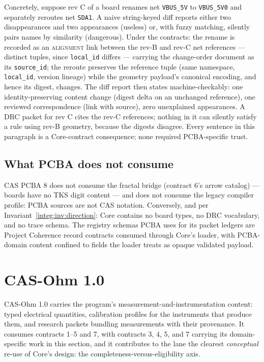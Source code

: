 \begin{example}\label{integ:ex:pcba}
Concretely, suppose rev C of a board renames net \texttt{VBUS\_5V} to \texttt{VBUS\_5V0} and separately reroutes net \texttt{SDA1}. A naive string-keyed diff reports either two disappearances and two appearances (useless) or, with fuzzy matching, silently pairs names by similarity (dangerous). Under the contracts: the rename is recorded as an \textsc{alignment} link between the rev-B and rev-C net references --- distinct tuples, since \texttt{local\_id} differs --- carrying the change-order document as its \texttt{source\_id}; the reroute preserves the reference tuple (same namespace, \texttt{local\_id}, version lineage) while the geometry payload's canonical encoding, and hence its digest, changes. The diff report then states machine-checkably: one identity-preserving content change (digest delta on an unchanged reference), one reviewed correspondence (link with source), zero unexplained appearances. A DRC packet for rev C cites the rev-C references; nothing in it can silently satisfy a rule using rev-B geometry, because the digests disagree. Every sentence in this paragraph is a Core-contract consequence; none required PCBA-specific trust.
\end{example}

\subsection{What PCBA does not consume}\label{integ:pcba:not}

CAS PCBA 8 does not consume the fractal bridge (contract 6's arrow catalog) --- boards have no TKS digit content --- and does not consume the legacy compiler profile: PCBA sources are not CAS notation. Conversely, and per Invariant~\ref{integ:inv:direction}: Core contains no board types, no DRC vocabulary, and no trace schema. The registry schemas PCBA uses for its packet ledgers are Project Coherence record contracts consumed through Core's loader, with PCBA-domain content confined to fields the loader treats as opaque validated payload.

\section{CAS-Ohm 1.0}\label{integ:ohm}

CAS-Ohm 1.0 carries the program's measurement-and-instrumentation content: typed electrical quantities, calibration profiles for the instruments that produce them, and research packets bundling measurements with their provenance. It consumes contracts 1--5 and 7, with contracts 3, 4, 5, and 7 carrying its domain-specific work in this section, and it contributes to the lane the clearest \emph{conceptual} re-use of Core's design: the completeness-versus-eligibility axis.

